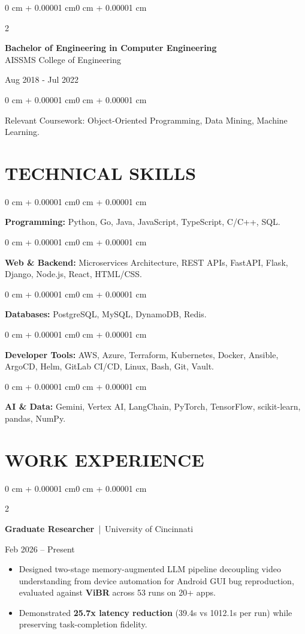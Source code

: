 \documentclass[10pt, letterpaper]{article}
\newenvironment{highlights}{
    \begin{itemize}[
        topsep=0.10 cm,
        parsep=0.06 cm,
        partopsep=0pt,
        itemsep=0.06 cm,
        leftmargin=12pt
    ]
}{
    \end{itemize}
}
\newenvironment{onecolentry}{
    \begin{adjustwidth}{0 cm + 0.00001 cm}{0 cm + 0.00001 cm}
}{
    \end{adjustwidth}
}
\newenvironment{twocolentry}[2][]{
    \onecolentry
    \def\secondColumn{#2}
    \setcolumnwidth{\fill, 4.5 cm}
    \begin{paracol}{2}
}{
    \switchcolumn \raggedleft \secondColumn
    \end{paracol}
    \endonecolentry
}
\begin{document}
\begin{twocolentry}{
    Aug 2018 - Jul 2022
}
    \textbf{Bachelor of Engineering in Computer Engineering} \\
    AISSMS College of Engineering
\end{twocolentry}
\begin{onecolentry}
Relevant Coursework: Object-Oriented Programming, Data Mining, Machine Learning.
\end{onecolentry}
\section{TECHNICAL SKILLS}
\begin{onecolentry}
\textbf{Programming:} Python, Go, Java, JavaScript, TypeScript, C/C++, SQL.
\end{onecolentry}
\vspace{0.06 cm}
\begin{onecolentry}
\textbf{Web \& Backend:} Microservices Architecture, REST APIs, FastAPI, Flask, Django, Node.js, React, HTML/CSS.
\end{onecolentry}
\vspace{0.06 cm}
\begin{onecolentry}
\textbf{Databases:} PostgreSQL, MySQL, DynamoDB, Redis.
\end{onecolentry}
\vspace{0.06 cm}
\begin{onecolentry}
\textbf{Developer Tools:} AWS, Azure, Terraform, Kubernetes, Docker, Ansible, ArgoCD, Helm, GitLab CI/CD, Linux, Bash, Git, Vault.
\end{onecolentry}
\vspace{0.06 cm}
\begin{onecolentry}
\textbf{AI \& Data:} Gemini, Vertex AI, LangChain, PyTorch, TensorFlow, scikit-learn, pandas, NumPy.
\end{onecolentry}

\section{WORK EXPERIENCE}
\begin{twocolentry}{Feb 2026 -- Present}
\textbf{Graduate Researcher} \,|\, University of Cincinnati
\end{twocolentry}
\begin{highlights}
  \item Designed two-stage memory-augmented LLM pipeline decoupling video understanding from device automation for Android GUI bug reproduction, evaluated against \textbf{ViBR} across 53 runs on 20+ apps.
  \item Demonstrated \textbf{25.7x latency reduction} (39.4s vs 1012.1s per run) while preserving task-completion fidelity.
\end{highlights}
\end{document}

